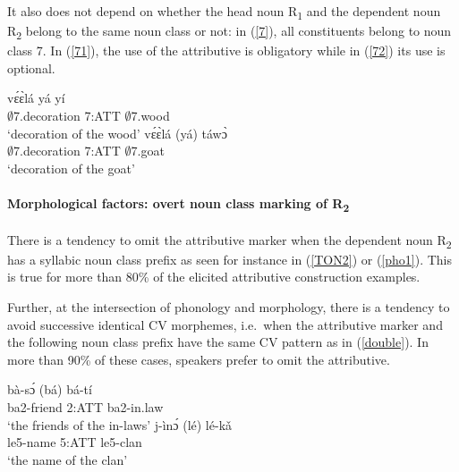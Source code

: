 \noindent It also does not depend on whether  the head noun R\textsubscript{1} and the dependent noun R\textsubscript{2} belong to the same noun class or not: in (\ref{7}), all constituents belong to noun class 7. In (\ref{71}), the use of the attributive is obligatory while in (\ref{72}) its use is optional.

\begin{exe}
\ex\label{7}
\begin{xlist}
\ex \label{71}
  \gll     vɛ́ɛ̀lá yá yí \\
              $\emptyset$7.decoration 7:ATT $\emptyset$7.wood \\
    \trans `decoration of the wood'
\ex\label{72}
 \gll    vɛ́ɛ̀lá (yá) táwɔ̀  \\
             $\emptyset$7.decoration 7:ATT $\emptyset$7.goat   \\
    \trans `decoration of the goat'
\end {xlist}
\end{exe}

\paragraph{Morphological factors: overt noun class marking of R\textsubscript{2}} There is a  tendency to omit the attributive marker when the dependent noun R\textsubscript{2} has a syllabic noun class prefix as seen for instance in (\ref{TON2}) or (\ref{pho1}). This is true for more than 80\% of the elicited attributive construction examples.

Further, at the intersection of phonology and morphology, there is a tendency to avoid successive identical CV morphemes, i.e.~when the attributive marker and the following noun class prefix have the same CV pattern as in (\ref{double}). In more than 90\% of these cases, speakers prefer to omit the attributive.

\begin{exe}
\ex\label{double}
\begin{xlist}
\ex \label{double1}
  \gll     bà-sɔ́ (bá) bá-tí \\
               ba2-friend 2:ATT ba2-in.law \\
    \trans `the friends of the in-laws'
\ex\label{double2}
 \gll    j-ìnɔ́ (lé) lé-kǎ \\
             le5-name 5:ATT le5-clan   \\
    \trans `the name of the clan'
\end {xlist}
\end{exe}

